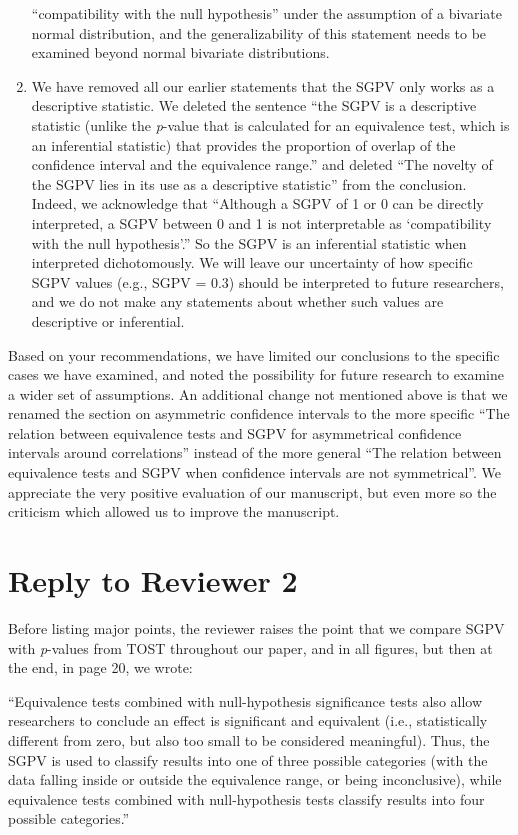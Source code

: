 \documentclass[man]{apa6}
\begin{document}
\begin{enumerate}
{  \enquote{compatibility with the null hypothesis} under the assumption
  of a bivariate normal distribution, and the generalizability of this
  statement needs to be examined beyond normal bivariate distributions.}
\item
  We have removed all our earlier statements that the SGPV only works as
  a descriptive statistic. We deleted the sentence \enquote{the SGPV is
  a descriptive statistic (unlike the \emph{p}-value that is calculated
  for an equivalence test, which is an inferential statistic) that
  provides the proportion of overlap of the confidence interval and the
  equivalence range.} and deleted \enquote{The novelty of the SGPV lies
  in its use as a descriptive statistic} from the conclusion. Indeed, we
  acknowledge that \enquote{Although a SGPV of 1 or 0 can be directly
  interpreted, a SGPV between 0 and 1 is not interpretable as
  \enquote{compatibility with the null hypothesis}.} So the SGPV is an
  inferential statistic when interpreted dichotomously. We will leave
  our uncertainty of how specific SGPV values (e.g., SGPV = 0.3) should
  be interpreted to future researchers, and we do not make any
  statements about whether such values are descriptive or inferential.
\end{enumerate}

Based on your recommendations, we have limited our conclusions to the
specific cases we have examined, and noted the possibility for future
research to examine a wider set of assumptions. An additional change not
mentioned above is that we renamed the section on asymmetric confidence
intervals to the more specific \enquote{The relation between equivalence
tests and SGPV for asymmetrical confidence intervals around
correlations} instead of the more general \enquote{The relation between
equivalence tests and SGPV when confidence intervals are not
symmetrical}. We appreciate the very positive evaluation of our
manuscript, but even more so the criticism which allowed us to improve
the manuscript.

\section{Reply to Reviewer 2}\label{reply-to-reviewer-2}

Before listing major points, the reviewer raises the point that we
compare SGPV with \emph{p}-values from TOST throughout our paper, and in
all figures, but then at the end, in page 20, we wrote:

\enquote{Equivalence tests combined with null-hypothesis significance
tests also allow researchers to conclude an effect is significant and
equivalent (i.e., statistically different from zero, but also too small
to be considered meaningful). Thus, the SGPV is used to classify results
into one of three possible categories (with the data falling inside or
outside the equivalence range, or being inconclusive), while equivalence
tests combined with null-hypothesis tests classify results into four
possible categories.}
\end{document}
